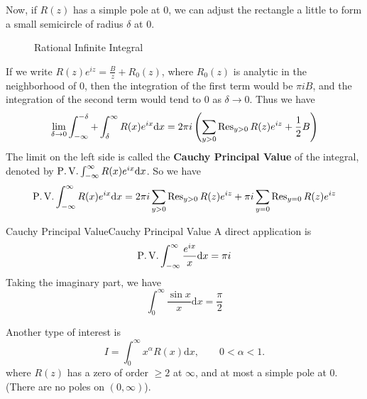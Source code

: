 \documentclass[../main.tex]{subfiles}
\begin{document}
Now, if $R(z)$ has a simple pole at $0$, we can adjust the rectangle a little to form a small semicircle of radius $\delta$ at $0$.

\begin{figure}[ht]
    \centering
    \caption{Rational Infinite Integral}
    \label{fig:rational-infinite-integral}
\end{figure}

If we write $R(z) e^{iz} = \frac{B}{z} + R_0(z)$, where $R_0(z)$ is analytic in the neighborhood of $0$, then the integration of the first term would be $\pi i B$, and the integration of the second term would tend to $0$ as $\delta \rightarrow 0$. Thus we have
\begin{equation}
	\lim_{\delta \to 0} \int_{-\infty }^{-\delta} + \int_{\delta}^{\infty} R(x) e^{ix} \mathrm{d} x = 2 \pi i \left(\sum_{y>0} \operatorname{Res}_{y>0} R(z) e^{iz} + \frac{1}{2} B\right)
\end{equation}
The limit on the left side is called the \textbf{Cauchy Principal Value} of the integral, denoted by $\operatorname{P.V.} \int_{-\infty}^{\infty} R(x) e^{ix} \mathrm{d} x$. So we have
\begin{equation}
	\operatorname{P.V.} \int_{-\infty}^{\infty} R(x) e^{ix} \mathrm{d} x = 2 \pi i \sum_{y>0} \operatorname{Res}_{y>0} R(z) e^{iz} + \pi i \sum_{y=0} \operatorname{Res}_{y=0} R(z) e^{iz}
\end{equation}
\begin{example}{Cauchy Principal Value}{Cauchy Principal Value}
	A direct application is
	\begin{equation*}
		\operatorname{P.V.} \int_{-\infty}^{\infty} \frac{e^{ix}}{x} \mathrm{d} x = \pi i
	\end{equation*}
	Taking the imaginary part, we have
	\begin{equation*}
		\int_{0}^{\infty} \frac{\sin x}{x} \mathrm{d} x = \frac{\pi}{2}
	\end{equation*}
\end{example}

Another type of interest is
\begin{equation}
	I = \int_{0}^{\infty } x^{\alpha} R(x) \mathrm{d} x, \qquad 0<\alpha<1.
\end{equation}
where $R(z)$ has a zero of order $\geq 2$ at $\infty $, and at most a simple pole at $0$. (There are no poles on $(0,\infty )$).
\end{document}
